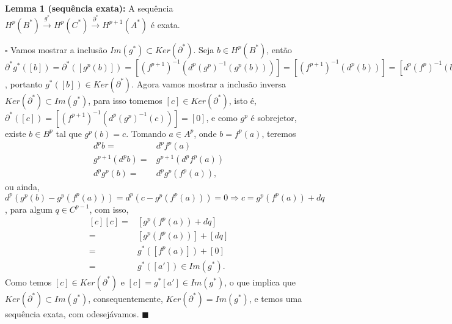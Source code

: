 \documentclass{article}
\begin{document}
	\textbf{Lemma 1 (sequência exata):} A sequência $H^{p}(B^{*}) \xrightarrow{g^{*}} H^{p}(C^{*}) \xrightarrow{\partial^{*}} H^{p+1}(A^{*})$ é exata.
	
	$\square$ Vamos mostrar a inclusão $Im(g^{*}) \subset Ker(\partial^{*})$. Seja $b \in H^{p}(B^{*})$, então $\partial^{*}g^{*}([b]) = \partial^{*}([g^{p}(b)]) = [(f^{p+1})^{-1}(d^{p}(g^{p})^{-1}(g^{p}(b)))] = [(f^{p+1})^{-1}(d^{p}(b))] = [d^{p}(f^{p})^{-1}(b)] = [0]$, portanto $g^{*}([b]) \in Ker(\partial^{*})$. Agora vamos mostrar a inclusão inversa $Ker(\partial^{*}) \subset Im(g^{*})$, para isso tomemos $[c] \in Ker(\partial^{*})$, isto é, $\partial^{*}([c]) = [(f^{p+1})^{-1}(d^{p}(g^{p})^{-1}(c))] = [0]$, e como $g^{p}$ é sobrejetor, existe $b \in B^{p}$ tal que $g^{p}(b) = c$. Tomando $a \in A^{p}$, onde $b = f^{p}(a)$, teremos 
	$$
	\begin{aligned}
	d^{p}b =& d^{p}f^{p}(a)
	\\
	g^{p+1}(d^{p}b) =&  g^{p+1}(d^{p}f^{p}(a)) 
	\\
	d^{p}g^{p}(b) =& d^{p}g^{p}(f^{p}(a)),
	\end{aligned}
	$$
	ou ainda, $d^{p}(g^{p}(b) - g^{p}(f^{p}(a)))=d^{p}(c - g^{p}(f^{p}(a)))=0 \Rightarrow c = g^{p}(f^{p}(a)) + dq$, para algum $q \in C^{p-1}$, com isso, 
	$$
	\begin{aligned}
	[c][c] =& [g^{p}(f^{p}(a)) + dq] 
	\\
	=& [g^{p}(f^{p}(a))] + [dq] 
	\\
	=& g^{*}([f^{p}(a)]) +[0] 
	\\
	=& g^{*}([a']) \in  Im(g^{*}).
	\end{aligned}
	$$
	Como temos $[c] \in Ker(\partial^{*})$ e $[c] = g^{*}[a'] \in Im(g^{*})$, o que implica que $Ker(\partial^{*}) \subset Im(g^{*})$, consequentemente, $Ker(\partial^{*}) = Im(g^{*})$, e temos uma sequência exata, com odesejávamos. $\blacksquare$
\end{document}
